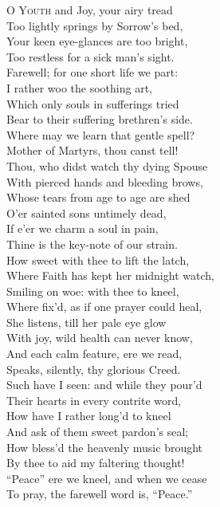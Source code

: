 \textsc{O Youth} and Joy, your airy tread \\
 Too lightly springs by Sorrow’s bed, \\
 Your keen eye-glances are too bright, \\
 Too restless for a sick man’s sight. \\
 Farewell; for one short life we part: \\
 I rather woo the soothing art, \\
 Which only souls in sufferings tried \\
 Bear to their suffering brethren’s side. \\
  Where may we learn that gentle spell? \\
 Mother of Martyrs, thou canst tell! \\
 Thou, who didst watch thy dying Spouse \\
 With pierced hands and bleeding brows, \\
 Whose tears from age to age are shed \\
 O’er sainted sons untimely dead, \\
 If e’er we charm a soul in pain, \\
 Thine is the key-note of our strain. \\
  How sweet with thee to lift the latch, \\
 Where Faith has kept her midnight watch, \\
 Smiling on woe: with thee to kneel, \\
 Where fix’d, as if one prayer could heal, \\
 She listens, till her pale eye glow \\
 With joy, wild health can never know, \\
 And each calm feature, ere we read, \\
 Speaks, silently, thy glorious Creed. \\
  Such have I seen: and while they pour’d \\
 Their hearts in every contrite word, \\
 How have I rather long’d to kneel \\
 And ask of them sweet pardon’s seal; \\
 How bless’d the heavenly music brought \\
 By thee to aid my faltering thought! \\
 “Peace” ere we kneel, and when we cease \\
 To pray, the farewell word is, “Peace.” \\
